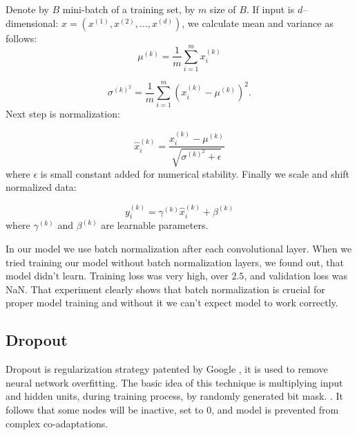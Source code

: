 \documentclass[licencjacka,en]{pracamgr}
\begin{document}
Denote by $B$ mini-batch of a training set, by $m$ size of $B$. If input is $d$--dimensional: $x = (x^{(1)}, x^{(2)}, \ldots, x^{(d)})$, we calculate mean and variance as follows:
$$\mu^{(k)} = \frac{1}{m}\sum_{i=1}^m x^{(k)}_i$$

$$ \sigma^{{(k)}^2} = \frac{1}{m} \sum_{i = 1}^{m} \left(x^{(k)}_i - \mu^{(k)}\right) ^ 2.$$
Next step is normalization:

$$
\hat{x} ^ {(k)} _ i = \frac{x^{(k)}_i - \mu^{(k)}} {\sqrt{ \sigma^{{(k)}^2} + \epsilon}}
$$
where $\epsilon$ is small constant added for numerical stability. Finally we scale and shift normalized data:

$$ y^{(k)}_i = \gamma^{(k)} \hat{x}^{(k)}_i + \beta^{(k)}$$
where $\gamma^{(k)}$ and $\beta^{(k)}$ are learnable parameters.

In our model we use batch normalization after each convolutional layer. When we tried training our model without batch normalization layers, we found out, that model didn't learn. Training loss was very high, over $2.5$, and validation loss was NaN. That experiment clearly shows that batch normalization is crucial for proper model training and without it we can't expect model to work correctly.

\subsection{Dropout}
Dropout is regularization strategy patented by Google \cite{DROPG}, it is used to remove neural network overfitting. The basic idea of this technique is multiplying input and hidden units, during training process, by randomly generated bit mask. \cite{DROPW}. It follows that some nodes will be inactive, set to 0, and model is prevented from complex co-adaptations.

\dropouticm
\end{document}
